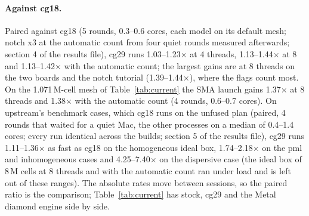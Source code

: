 \paragraph{Against cg18.} Paired against cg18 (5 rounds, 0.3--0.6 cores, each model on its default mesh; notch x3 at
the automatic count from four quiet rounds measured afterwards; section 4 of the results file), cg29 runs
1.03--1.23$\times$ at 4 threads, 1.13--1.44$\times$ at 8 and 1.13--1.42$\times$ with the automatic count; the largest
gains are at 8 threads on the two boards and the notch tutorial (1.39--1.44$\times$), where the flags count most. On
the 1.071\,M-cell mesh of Table~\ref{tab:current} the SMA launch gains 1.37$\times$ at 8 threads and 1.38$\times$ with
the automatic count (4 rounds, 0.6--0.7 cores). On upstream's benchmark cases, which cg18 runs on the unfused plan
(paired, 4 rounds that waited for a quiet Mac, the other processes on a median of 0.4--1.4 cores; every run identical
across the builds; section 5 of the results file), cg29 runs 1.11--1.36$\times$ as fast as cg18 on the homogeneous
ideal box, 1.74--2.18$\times$ on the pml and inhomogeneous cases and 4.25--7.40$\times$ on the dispersive case (the
ideal box of 8\,M cells at 8 threads and with the automatic count ran under load and is left out of these ranges).
The absolute rates move between sessions, so the paired ratio is the comparison; Table~\ref{tab:current} has stock,
cg29 and the Metal diamond engine side by side.

